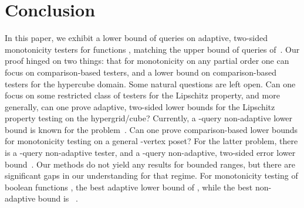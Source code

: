 \documentclass[11pt]{article}
\begin{document}
\section{Conclusion}
In this paper, we exhibit a lower bound of  queries on adaptive, two-sided monotonicity testers for functions , matching the upper bound of  queries of~\cite{ChSe13}. Our proof hinged on two things: that for monotonicity on any partial order one can focus on comparison-based testers, and a lower bound on comparison-based testers for the hypercube domain.  Some natural questions are left open. Can one focus on some restricted class of testers for the Lipschitz property, and more generally, can one prove adaptive, two-sided lower bounds for the Lipschitz property testing on the hypergrid/cube? 
Currently, a -query non-adaptive lower bound is known for the problem~\cite{BlJh+12}.
Can one prove comparison-based lower bounds for monotonicity testing on a general -vertex poset? For the latter problem, there is a -query non-adaptive tester, and a -query non-adaptive, two-sided error lower bound~\cite{FLNRRS02}.
Our methods do not yield any results for bounded ranges, but there are significant gaps in our understanding for that regime. 
For monotonicity testing of boolean functions , the best adaptive lower bound
of , while the best non-adaptive bound is ~\cite{FLNRRS02}. 



\end{document}
